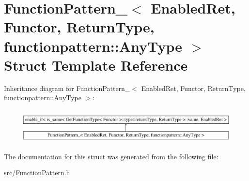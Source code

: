 \hypertarget{struct_function_pattern___3_01_enabled_ret_00_01_functor_00_01_return_type_00_01functionpattern_1_1_any_type_01_4}{\section{Function\-Pattern\-\_\-$<$ Enabled\-Ret, Functor, Return\-Type, functionpattern\-:\-:Any\-Type $>$ Struct Template Reference}
\label{struct_function_pattern___3_01_enabled_ret_00_01_functor_00_01_return_type_00_01functionpattern_1_1_any_type_01_4}
}
Inheritance diagram for Function\-Pattern\-\_\-$<$ Enabled\-Ret, Functor, Return\-Type, functionpattern\-:\-:Any\-Type $>$\-:\begin{figure}[H]
\begin{center}
\leavevmode
\includegraphics[height=1.833061cm]{struct_function_pattern___3_01_enabled_ret_00_01_functor_00_01_return_type_00_01functionpattern_1_1_any_type_01_4}
\end{center}
\end{figure}


The documentation for this struct was generated from the following file\-:\begin{DoxyCompactItemize}
\item 
src/Function\-Pattern.\-h\end{DoxyCompactItemize}
